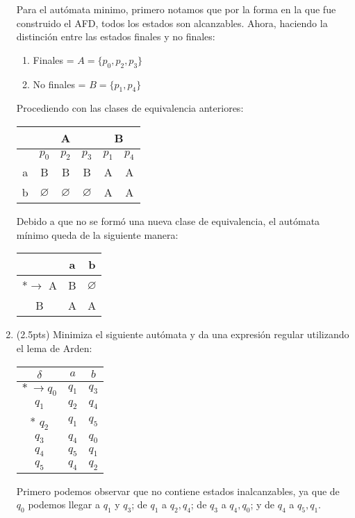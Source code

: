 \documentclass{article}
\begin{document}
\begin{enumerate}
    Para el autómata minimo, primero notamos que por la forma en la que fue construido el AFD, todos los estados son alcanzables. Ahora, haciendo la distinción entre las estados finales y no finales:
    \begin{enumerate}
      \item Finales = $A = \{p_0, p_2, p_3\}$
      \item No finales = $B = \{p_1, p_4\}$
    \end{enumerate}
    Procediendo con las clases de equivalencia anteriores:
    \begin{table}[h]
      \centering
      \begin{tabular}{c | c | c | c | c | c}
        & \multicolumn{3}{c|}{A} & \multicolumn{2}{c}{B} \\    
        \hline
        & $p_0$ & $p_2$ & $p_3$ & $p_1$ & $p_4$  \\
        \hline
        a & B & B & B & A & A \\
        b & $\varnothing$ & $\varnothing$ & $\varnothing$ & A & A \\
      \end{tabular}
    \end{table}

    Debido a que no se formó una nueva clase de equivalencia, el autómata mínimo queda de la siguiente manera:
      \begin{table}[!h]
        \centering
          \begin{tabular}{c | c | c}
          & a & b \\
          \hline
            *$\rightarrow$ A & B & $\varnothing$ \\
            B & A & A \\
          \end{tabular}
      \end{table}

    \item (2.5pts) Minimiza el siguiente autómata y da una expresión regular utilizando el lema de Arden:
        \begin{table}[!h]
            \centering
            \begin{tabular}{c|c|c}
                $\delta$ & $a$ & $b$ \\ \hline
                $*~\rightarrow q_0$ & $q_1$ & $q_3$ \\
                $q_1$ & $q_2$ & $q_4$ \\
                * $q_2$ & $q_1$ & $q_5$ \\
                $q_3$ & $q_4$ & $q_0$ \\
                $q_4$ & $q_5$ & $q_1$ \\
                $q_5$ & $q_4$ & $q_2$
            \end{tabular}
        \end{table}
        \newline
        Primero podemos observar que no contiene estados inalcanzables, ya que de $q_0$ podemos llegar a $q_1$ y $q_3$; de $q_1$ a $q_2,q_4$; de $q_3$ a $q_4, q_0$; y de $q_4$ a $q_5, q_1$.\\


\end{enumerate}
\end{document}

